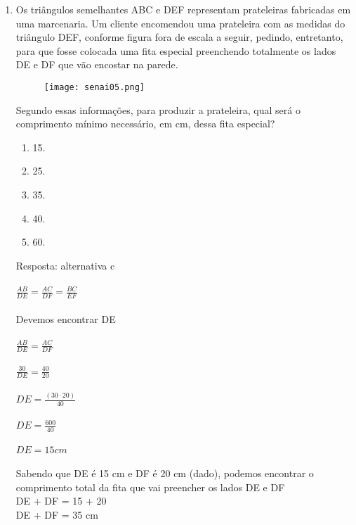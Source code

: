 \documentclass[a4paper,14pt]{article}
\begin{document}
\begin{enumerate}
	    \item Os triângulos semelhantes ABC e DEF representam prateleiras fabricadas em uma marcenaria. Um
	    cliente encomendou uma prateleira com as medidas do triângulo DEF, conforme figura fora de escala a
	    seguir, pedindo, entretanto, para que fosse colocada uma fita especial preenchendo totalmente os lados
	    DE e DF que vão encostar na parede.
	    \newline
	    \newline
	    \newline
	    \newline
	    \newline
	    \newline
	    \newline
	    \newline
	    \newline
	    \newline
	    \newline
	    \newline
	    \newline
        \begin{figure}[h] %
        	\centering
        	\texttt{[image: senai05.png]} %
        \end{figure}
        Segundo essas informações, para produzir a prateleira, qual será o comprimento mínimo necessário,
        em cm, dessa fita especial?
        \begin{enumerate}
        	\item 15.
        	\item 25.
        	\item 35.
        	\item 40.
        	\item 60.
        \end{enumerate}
        Resposta: alternativa c \\ \\
        $\frac{AB}{DE} = \frac{AC}{DF} = \frac{BC}{EF}$ \\ \\
        Devemos encontrar DE \\ \\
        $\frac{AB}{DE} = \frac{AC}{DF}$ \\ \\
        $\frac{30}{DE} = \frac{40}{20}$ \\ \\
        $DE = \frac{(30 \cdot 20)}{40}$ \\ \\
        $DE = \frac{600}{40}$ \\ \\
        $DE = 15cm$ \\ \\ 
        Sabendo que DE é 15 cm e DF é 20 cm (dado), podemos encontrar o comprimento total da fita que vai preencher os lados DE e DF \\
        DE + DF = 15 + 20 \\
        DE + DF = 35 cm \\ \\
    

\end{enumerate}
\end{document}
